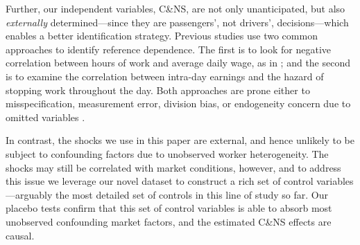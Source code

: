 \documentclass[reviewmode,AEJ]{AEA}
\begin{document}
Further, our independent variables, C\&NS, are not only unanticipated, but also \textit{externally} 
determined---since they are passengers', not drivers', decisions---which enables a better identification
strategy. Previous studies use two common approaches to identify reference dependence. The first is to
look for negative correlation between hours of work and average daily wage, as in \citet{camerer1997labor}; %
and the second  is to examine the correlation between intra-day earnings and the hazard of stopping work throughout the day. 
Both approaches are prone either to misspecification, measurement error, division bias, or endogeneity concern due to omitted variables \citep{oettinger1999empirical, farber2005tomorrow}. 

In contrast, the shocks we use in this paper %
are external, and hence unlikely to be subject to confounding factors 
due to unobserved worker heterogeneity. The shocks may still be correlated with market conditions, however, 
and to address this issue we leverage our novel dataset to construct a rich set of control variables---arguably 
the most detailed set of controls in this line of study so far. 
Our placebo tests confirm that this set of control variables is able to absorb most unobserved confounding market factors, and the estimated C\&NS effects are causal.
\end{document}
